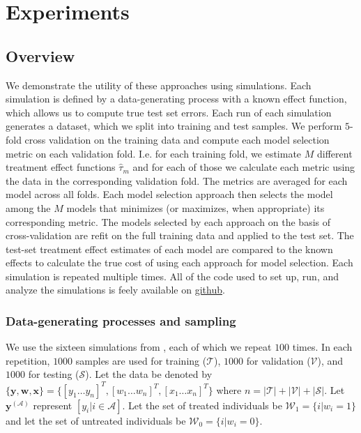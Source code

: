 \section{Experiments}
\label{simulations}

\subsection{Overview}

We demonstrate the utility of these approaches using simulations. Each simulation is defined by a data-generating process with a known effect function, which allows us to compute true test set errors. Each run of each simulation generates a dataset, which we split into training and test samples. We perform $5$-fold cross validation on the training data and compute each model selection metric on each validation fold. I.e. for each training fold, we estimate $M$ different treatment effect functions $\hat\tau_m$ and for each of those we calculate each metric using the data in the corresponding validation fold. The metrics are averaged for each model across all folds. Each model selection approach then selects the model among the $M$ models that minimizes (or maximizes, when appropriate) its corresponding metric. The models selected by each approach on the basis of cross-validation are refit on the full training data and applied to the test set. The test-set treatment effect estimates of each model are compared to the known effects to calculate the true cost of using each approach for model selection. Each simulation is repeated multiple times. All of the code used to set up, run, and analyze the simulations is feely available on \href{https://github.com/som-shahlab/ITE-model-selection}{github}.

\subsubsection{Data-generating processes and sampling}

We use the sixteen simulations from \citet{Powers:2017wd}, each of which we repeat $100$ times. In each repetition, $1000$ samples are used for training ($\mathcal{T}$), $1000$ for validation ($\mathcal{V}$), and $1000$ for testing ($\mathcal{S}$). Let the data be denoted by $\{\bm y, \bm w, \bm x\} = \{[y_1 \dots y_n]^T, [w_1 \dots w_n]^T, [x_1 \dots x_n]^T\}$ where $n = |\mathcal{T}| + |\mathcal{V} | + |\mathcal{S}|$. Let $\bm y^{(\mathcal A)}$ represent $[y_i | i \in \mathcal A]$. Let the set of treated individuals be $\mathcal W_1 = \{i | w_i =1\}$ and let the set of untreated individuals be $\mathcal W_0 = \{i | w_i =0\}$.

